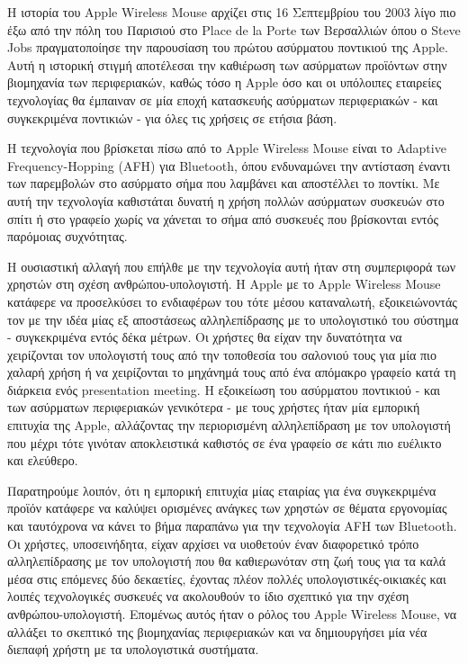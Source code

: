 \documentclass[
]{article}
\begin{document}
Η ιστορία του Apple Wireless Mouse αρχίζει στις 16 Σεπτεμβρίου του 2003
λίγο πιο έξω από την πόλη του Παρισιού στο Place de la Porte των
Βερσαλλιών όπου ο Steve Jobs πραγματοποίησε την παρουσίαση του πρώτου
ασύρματου ποντικιού της Apple. Αυτή η ιστορική στιγμή αποτέλεσαι την
καθιέρωση των ασύρματων προϊόντων στην βιομηχανία των περιφεριακών,
καθώς τόσο η Apple όσο και οι υπόλοιπες εταιρείες τεχνολογίας θα
έμπαιναν σε μία εποχή κατασκευής ασύρματων περιφεριακών - και
συγκεκριμένα ποντικιών - για όλες τις χρήσεις σε ετήσια βάση.

Η τεχνολογία που βρίσκεται πίσω από το Apple Wireless Mouse είναι το
Adaptive Frequency-Hopping (AFH) για Bluetooth, όπου ενδυναμώνει την
αντίσταση έναντι των παρεμβολών στο ασύρματο σήμα που λαμβάνει και
αποστέλλει το ποντίκι. Με αυτή την τεχνολογία καθιστάται δυνατή η χρήση
πολλών ασύρματων συσκευών στο σπίτι ή στο γραφείο χωρίς να χάνεται το
σήμα από συσκευές που βρίσκονται εντός παρόμοιας συχνότητας.

Η ουσιαστική αλλαγή που επήλθε με την τεχνολογία αυτή ήταν στη
συμπεριφορά των χρηστών στη σχέση ανθρώπου-υπολογιστή. Η Apple με το
Apple Wireless Mouse κατάφερε να προσελκύσει το ενδιαφέρων του τότε
μέσου καταναλωτή, εξοικειώνοντάς τον με την ιδέα μίας εξ αποστάσεως
αλληλεπίδρασης με το υπολογιστικό του σύστημα - συγκεκριμένα εντός δέκα
μέτρων. Οι χρήστες θα είχαν την δυνατότητα να χειρίζονται τον υπολογιστή
τους από την τοποθεσία του σαλονιού τους για μία πιο χαλαρή χρήση ή να
χειρίζονται το μηχάνημά τους από ένα απόμακρο γραφείο κατά τη διάρκεια
ενός presentation meeting. Η εξοικείωση του ασύρματου ποντικιού - και
των ασύρματων περιφεριακών γενικότερα - με τους χρήστες ήταν μία
εμπορική επιτυχία της Apple, αλλάζοντας την περιορισμένη αλληλεπίδραση
με τον υπολογιστή που μέχρι τότε γινόταν αποκλειστικά καθιστός σε ένα
γραφείο σε κάτι πιο ευέλικτο και ελεύθερο.

Παρατηρούμε λοιπόν, ότι η εμπορική επιτυχία μίας εταιρίας για ένα
συγκεκριμένα προϊόν κατάφερε να καλύψει ορισμένες ανάγκες των χρηστών σε
θέματα εργονομίας και ταυτόχρονα να κάνει το βήμα παραπάνω για την
τεχνολογία AFH των Bluetooth. Οι χρήστες, υποσεινήδητα, είχαν αρχίσει να
υιοθετούν έναν διαφορετικό τρόπο αλληλεπίδρασης με τον υπολογιστή που θα
καθιερωνόταν στη ζωή τους για τα καλά μέσα στις επόμενες δύο δεκαετίες,
έχοντας πλέον πολλές υπολογιστικές-οικιακές και λοιπές τεχνολογικές
συσκευές να ακολουθούν το ίδιο σχεπτικό για την σχέση
ανθρώπου-υπολογιστή. Επομένως αυτός ήταν ο ρόλος του Apple Wireless
Mouse, να αλλάξει το σκεπτικό της βιομηχανίας περιφεριακών και να
δημιουργήσει μία νέα διεπαφή χρήστη με τα υπολογιστικά συστήματα.
\end{document}
